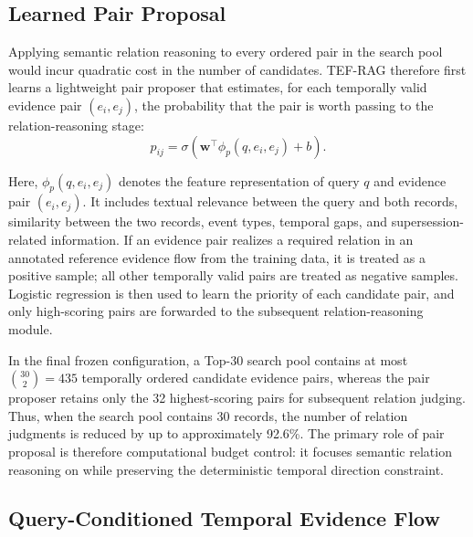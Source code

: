 \subsection{Learned Pair Proposal}

Applying semantic relation reasoning to every ordered pair in the search pool would incur quadratic cost in the number of candidates. TEF-RAG therefore first learns a lightweight pair proposer that estimates, for each temporally valid evidence pair $(e_i,e_j)$, the probability that the pair is worth passing to the relation-reasoning stage:
\begin{equation}
p_{ij}
=
\sigma\!\left(
\mathbf{w}^{\top}\phi_p(q,e_i,e_j)+b
\right).
\label{eq:pair_proposal}
\end{equation}

Here, $\phi_p(q,e_i,e_j)$ denotes the feature representation of query $q$ and evidence pair $(e_i,e_j)$. It includes textual relevance between the query and both records, similarity between the two records, event types, temporal gaps, and supersession-related information. If an evidence pair realizes a required relation in an annotated reference evidence flow from the training data, it is treated as a positive sample; all other temporally valid pairs are treated as negative samples. Logistic regression is then used to learn the priority of each candidate pair, and only high-scoring pairs are forwarded to the subsequent relation-reasoning module.

In the final frozen configuration, a Top-30 search pool contains at most
$\binom{30}{2}=435$ temporally ordered candidate evidence pairs,
whereas the pair proposer retains only the 32 highest-scoring pairs for subsequent relation judging.
Thus, when the search pool contains 30 records, the number of relation judgments is reduced by up to approximately 92.6\%.
The primary role of pair proposal is therefore computational budget control: it focuses semantic relation reasoning on  while preserving the deterministic temporal direction constraint.

\subsection{Query-Conditioned Temporal Evidence Flow}

